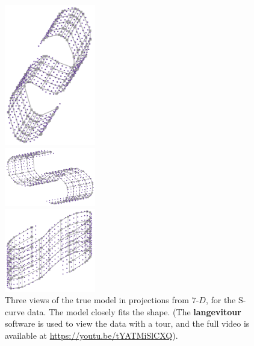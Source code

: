 \documentclass[
  12pt]{article}
\begin{document}
\begin{figure}[H]

\begin{minipage}{0.33\linewidth}
\begin{center}
\includegraphics[width=1.5625in,height=\textheight]{figures/scurve/sc_true_1.png}
\end{center}
\end{minipage}%
%
\begin{minipage}{0.33\linewidth}
\begin{center}
\includegraphics[width=1.5625in,height=\textheight]{figures/scurve/sc_true_2.png}
\end{center}
\end{minipage}%
%
\begin{minipage}{0.33\linewidth}
\begin{center}
\includegraphics[width=1.5625in,height=\textheight]{figures/scurve/sc_true_3.png}
\end{center}
\end{minipage}%

\caption{\label{fig-scurve-true-sc}Three views of the true model in
projections from \(7\text{-}D\), for the S-curve data. The model closely
fits the shape. (The \textbf{langevitour} software is used to view the
data with a tour, and the full video is available at
\url{https://youtu.be/tYATMiSlCXQ}).}

\end{figure}%
\end{document}
